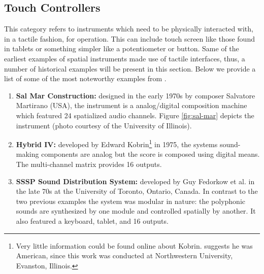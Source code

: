 \subsection{Touch Controllers} %

This category refers to instruments which need to be physically interacted with, in a tactile fashion, for operation. This can include touch screen like those found in tablets or something simpler like a potentiometer or button. Same of the earliest examples of spatial instruments made use of tactile interfaces, thus, a number of historical examples will be present in this section. Below we provide a list of some of the most noteworthy examples from \cite{pysiewicz2017instruments}.

\begin{enumerate}
    \item \textbf{Sal Mar Construction:} designed in the early 1970s by composer Salvatore Martirano (USA), the instrument is a analog/digital composition machine which featured 24 spatialized audio channels. Figure \ref{fig:sal-mar} depicts the instrument (photo courtesy of the University of Illinois).
    
    \item \textbf{Hybrid IV:} developed by Edward Kobrin\footnote{Very little information could be found online about Kobrin. \cite{kobrin1968solution} suggests he was American, since this work was conducted at Northwestern University, Evanston, Illinois.} in 1975, the systems sound-making components are analog but the score is composed using digital means. The multi-channel matrix provides 16 outputs. 
    
    \item \textbf{SSSP Sound Distribution System:} developed by Guy Fedorkow et al. in the late 70s at the University of Toronto, Ontario, Canada. In contrast to the two previous examples the system was modular in nature: the polyphonic sounds are synthesized by one module and controlled spatially by another. It also featured a keyboard, tablet, and 16 outputs. 
\end{enumerate}

